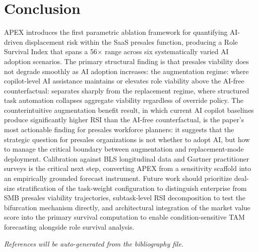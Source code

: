 \documentclass[10pt, conference]{IEEEtran}
\begin{document}
\section{Conclusion}

\label{sec:conclusion}

APEX introduces the first parametric ablation framework for quantifying AI-driven displacement risk within the SaaS presales function, producing a Role Survival Index that spans a 56$\times$ range across six systematically varied AI adoption scenarios. The primary structural finding is that presales viability does not degrade smoothly as AI adoption increases: the augmentation regime: where copilot-level AI assistance maintains or elevates role viability above the AI-free counterfactual: separates sharply from the replacement regime, where structured task automation collapses aggregate viability regardless of override policy. The counterintuitive augmentation benefit result, in which current AI copilot baselines produce significantly higher RSI than the AI-free counterfactual, is the paper's most actionable finding for presales workforce planners: it suggests that the strategic question for presales organizations is not whether to adopt AI, but how to manage the critical boundary between augmentation and replacement-mode deployment. Calibration against BLS longitudinal data and Gartner practitioner surveys is the critical next step, converting APEX from a sensitivity scaffold into an empirically grounded forecast instrument. Future work should prioritize deal-size stratification of the task-weight configuration to distinguish enterprise from SMB presales viability trajectories, subtask-level RSI decomposition to test the bifurcation mechanism directly, and architectural integration of the market value score into the primary survival computation to enable condition-sensitive TAM forecasting alongside role survival analysis.

\textit{References will be auto-generated from the bibliography file.}



\end{document}
